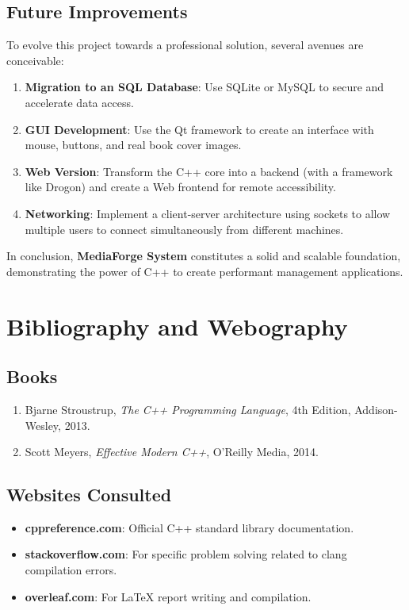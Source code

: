 \documentclass[12pt,a4paper]{report}
\begin{document}
\section{Future Improvements}
To evolve this project towards a professional solution, several avenues are conceivable:
\begin{enumerate}
    \item \textbf{Migration to an SQL Database}: Use SQLite or MySQL to secure and accelerate data access.
    \item \textbf{GUI Development}: Use the Qt framework to create an interface with mouse, buttons, and real book cover images.
    \item \textbf{Web Version}: Transform the C++ core into a backend (with a framework like Drogon) and create a Web frontend for remote accessibility.
    \item \textbf{Networking}: Implement a client-server architecture using sockets to allow multiple users to connect simultaneously from different machines.
\end{enumerate}

In conclusion, \textbf{MediaForge System} constitutes a solid and scalable foundation, demonstrating the power of C++ to create performant management applications.

\chapter*{Bibliography and Webography}

\section*{Books}
\begin{enumerate}
    \item Bjarne Stroustrup, \textit{The C++ Programming Language}, 4th Edition, Addison-Wesley, 2013.
    \item Scott Meyers, \textit{Effective Modern C++}, O'Reilly Media, 2014.
\end{enumerate}

\section*{Websites Consulted}
\begin{itemize}
    \item \textbf{cppreference.com}: Official C++ standard library documentation.
    \item \textbf{stackoverflow.com}: For specific problem solving related to clang compilation errors.
    \item \textbf{overleaf.com}: For LaTeX report writing and compilation.
\end{itemize}
\end{document}
